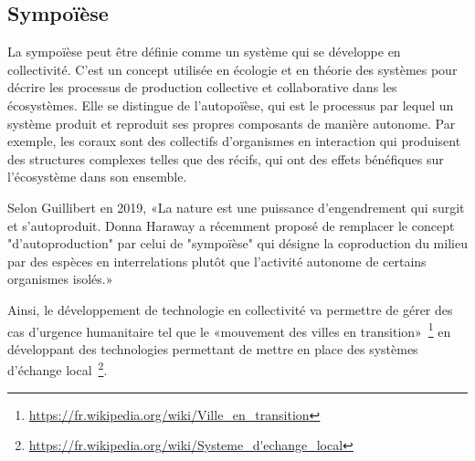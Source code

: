 
\subsection{Sympoïèse}

La sympoïèse peut être définie comme un système qui se développe en collectivité. C'est un concept utilisée en écologie et en théorie des systèmes pour décrire les processus de production collective et collaborative dans les écosystèmes. Elle se distingue de l'autopoïèse, qui est le processus par lequel un système produit et reproduit ses propres composants de manière autonome. Par exemple, les coraux sont des collectifs d'organismes en interaction qui produisent des structures complexes telles que des récifs, qui ont des effets bénéfiques sur l'écosystème dans son ensemble.

Selon Guillibert en 2019, «La nature est une puissance d’engendrement qui surgit et s’autoproduit. Donna Haraway a récemment proposé de remplacer le concept "d’autoproduction" par celui de "sympoïèse" qui désigne la coproduction du milieu par des espèces en interrelations plutôt que l’activité autonome de certains organismes isolés.»~\cite{guillibert:tel-02929676}

Ainsi, le développement de technologie en collectivité va permettre de gérer des cas d'urgence humanitaire tel que le «mouvement des villes en transition»~\cite{MOUV_063_0130}\footnote{\url{https://fr.wikipedia.org/wiki/Ville_en_transition}} en développant des technologies permettant de mettre en place des systèmes d'échange local~\cite{cibois2010compte}\footnote{\url{https://fr.wikipedia.org/wiki/Systeme_d'echange_local}}.





